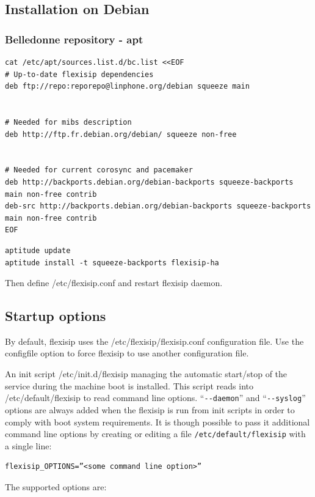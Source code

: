 \documentclass[a4paper,10pt]{article}
\begin{document}
\subsection{Installation on Debian}
\subsubsection{Belledonne repository - apt}
\begin{verbatim}
cat /etc/apt/sources.list.d/bc.list <<EOF
# Up-to-date flexisip dependencies
deb ftp://repo:reporepo@linphone.org/debian squeeze main


# Needed for mibs description
deb http://ftp.fr.debian.org/debian/ squeeze non-free


# Needed for current corosync and pacemaker
deb http://backports.debian.org/debian-backports squeeze-backports main non-free contrib
deb-src http://backports.debian.org/debian-backports squeeze-backports main non-free contrib
EOF
\end{verbatim} 

\begin{verbatim}
aptitude update
aptitude install -t squeeze-backports flexisip-ha
\end{verbatim}


Then define /etc/flexisip.conf and restart flexisip daemon.


\subsection{Startup options}
By default, flexisip uses the /etc/flexisip/flexisip.conf configuration file.
Use the configfile option to force flexisip to use another configuration file.

An init script /etc/init.d/flexisip managing the automatic start/stop of the service during the machine boot is installed.
This script reads into /etc/default/flexisip to read command line options. “\verb|--daemon|” and “\verb|--syslog|” options are always added when the flexisip is run from init scripts in order to comply with boot system requirements.
It is though possible to pass it additional command line options by creating or editing a file \verb|/etc/default/flexisip| with a single line:
\begin{verbatim}
flexisip_OPTIONS=”<some command line option>” 
\end{verbatim}


The supported options are:

\end{document}
